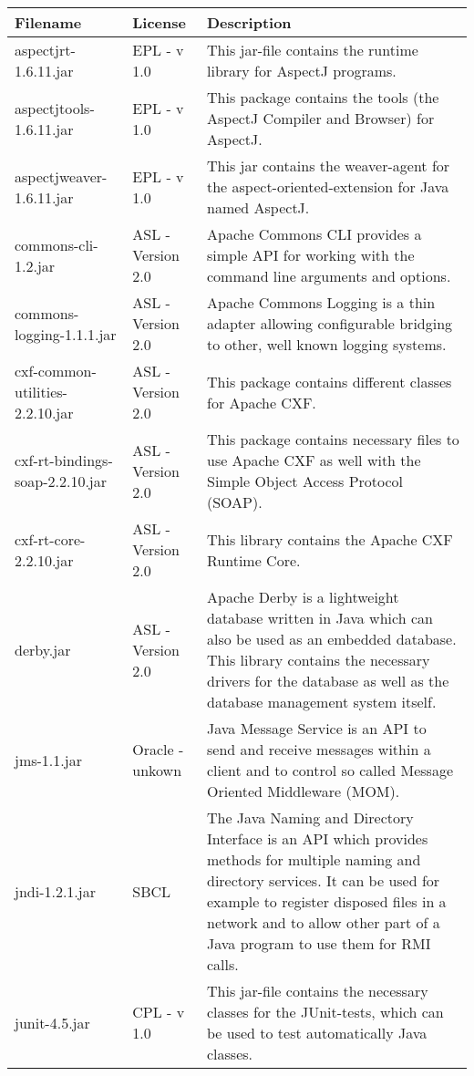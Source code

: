 \begin{center}
\begin{longtable}{|p{}|p{}|p{}|}
\hline 
Filename & License & Description\\
\hline
\hline 
aspectjrt-1.6.11.jar & EPL - v 1.0 & This jar-file contains the runtime library for AspectJ programs.\\
\hline 
aspectjtools-1.6.11.jar & EPL - v 1.0 & This package contains the tools (the AspectJ Compiler and Browser) for AspectJ.\\
\hline 
aspectjweaver-1.6.11.jar & EPL - v 1.0 & This jar contains the weaver-agent for the aspect-oriented-extension for Java named AspectJ.\\
\hline 
commons-cli-1.2.jar & ASL - Version 2.0 & Apache Commons CLI provides a simple API for working with the command line arguments and options.\\
\hline 
commons-logging-1.1.1.jar & ASL - Version 2.0 & Apache Commons Logging is a thin adapter allowing configurable bridging to other, well known logging systems.\\
\hline 
cxf-common-utilities-2.2.10.jar & ASL - Version 2.0 & This package contains different classes for Apache CXF.\\
\hline 
cxf-rt-bindings-soap-2.2.10.jar & ASL - Version 2.0 & This package contains necessary files to use Apache CXF as well with the Simple Object Access Protocol (SOAP).\\
\hline 
cxf-rt-core-2.2.10.jar & ASL - Version 2.0 & This library contains the Apache CXF Runtime Core.\\
\hline 
derby.jar & ASL - Version 2.0 & Apache Derby is a lightweight database written in Java which can also be used as an embedded database. This library contains the necessary drivers for the database as well as the database management system itself.\\
\hline 
jms-1.1.jar & Oracle - unkown & Java Message Service is an API to send and receive messages within a client and to control so called Message Oriented Middleware (MOM).\\
\hline 
jndi-1.2.1.jar & SBCL & The Java Naming and Directory Interface is an API which provides methods for multiple naming and directory services. It can be used for example to register disposed files in a network and to allow other part of a Java program to use them for RMI calls.\\
\hline 
junit-4.5.jar & CPL - v 1.0 & This jar-file contains the necessary classes for the JUnit-tests, which can be used to test automatically Java classes.\\

\end{longtable}
\end{center}
